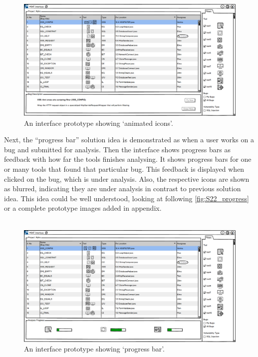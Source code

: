 \begin{figure}[hbt!]
	\centering
	\includegraphics[width=\linewidth]{figures/solution_ideas_snaps/S22_animation}
	\caption{An interface prototype showing ‘animated icons’.}
	\label{fig:S22_animation}
\end{figure}


Next, the “progress bar” solution idea is demonstrated as when a user works on a bug and submitted for analysis. Then the interface shows progress bars as feedback with how far the tools finishes analysing. It shows progress bars for one or many tools that found that particular bug. This feedback is displayed when clicked on the bug, which is under analysis. Also, the respective icons are shown as blurred, indicating they are under analysis in contrast to previous solution idea. This idea could be well understood, looking at following \autoref{fig:S22_progress} or a complete prototype images added in appendix.  \\ \\


\begin{figure}[hbt!]
	\centering
	\includegraphics[width=\linewidth]{figures/solution_ideas_snaps/S22_progress}
	\caption{An interface prototype showing ‘progress bar’.}
	\label{fig:S22_progress}
\end{figure}


